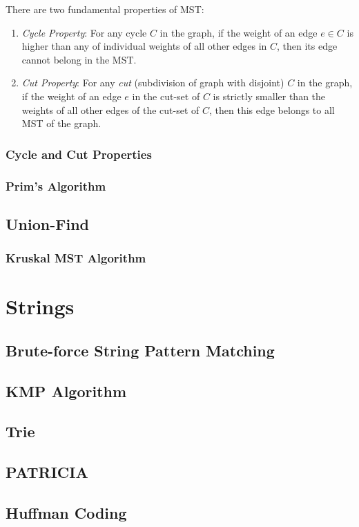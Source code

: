 \documentclass{report}
\begin{document}
There are two fundamental properties of MST:

\begin{enumerate}
  \item \textit{Cycle Property}: For any cycle $C$ in the graph, if the weight of an edge $e \in C$ is higher than any of individual weights of all other edges in $C$, then its edge cannot belong in the MST.
  \item \textit{Cut Property}: For any \textit{cut} (subdivision of graph with disjoint) $C$ in the graph, if the weight of an edge $e$ in the cut-set of $C$ is strictly smaller than the weights of all other edges of the cut-set of $C$, then this edge belongs to all MST of the graph.
\end{enumerate}

\subsection{Cycle and Cut Properties}

\subsection{Prim's Algorithm}

\section{Union-Find}

\subsection{Kruskal MST Algorithm}


\chapter{Strings}

\section{Brute-force String Pattern Matching}

\section{KMP Algorithm}

\section{Trie}

\section{PATRICIA}

\section{Huffman Coding}
\end{document}
